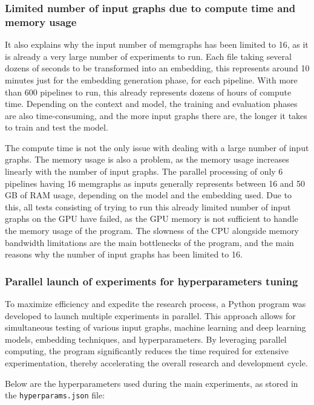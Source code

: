 \subsubsection{Limited number of input graphs due to compute time and memory usage}

It also explains why the input number of memgraphs has been limited to 16, as it is already a very large number of experiments to run. Each file taking several dozens of seconds to be transformed into an embedding, this represents around 10 minutes just for the embedding generation phase, for each pipeline. With more than 600 pipelines to run, this already represents dozens of hours of compute time. Depending on the context and model, the training and evaluation phases are also time-consuming, and the more input graphs there are, the longer it takes to train and test the model. 

The compute time is not the only issue with dealing with a large number of input graphs. The memory usage is also a problem, as the memory usage increases linearly with the number of input graphs. The parallel processing of only 6 pipelines having 16 memgraphs as inputs generally represents between 16 and 50 GB of RAM usage, depending on the model and the embedding used. Due to this, all tests consisting of trying to run this already limited number of input graphs on the GPU have failed, as the GPU memory is not sufficient to handle the memory usage of the program. The slowness of the CPU alongside memory bandwidth limitations are the main bottlenecks of the program, and the main reasons why the number of input graphs has been limited to 16.

\subsubsection{Parallel launch of experiments for hyperparameters tuning}

To maximize efficiency and expedite the research process, a Python program was developed to launch multiple experiments in parallel. This approach allows for simultaneous testing of various input graphs, machine learning and deep learning models, embedding techniques, and hyperparameters. By leveraging parallel computing, the program significantly reduces the time required for extensive experimentation, thereby accelerating the overall research and development cycle.

Below are the hyperparameters used during the main experiments, as stored in the \texttt{hyperparams.json} file:

